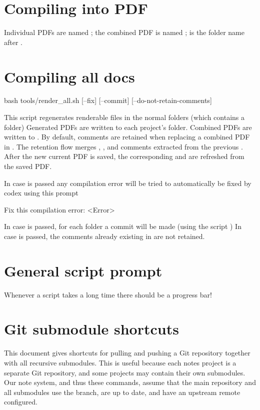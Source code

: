 {\section*{Compiling into PDF}
Individual PDFs are named ; the combined PDF is named ;  is the folder name after .

\section*{Compiling all docs}
\begin{DocCode}
  bash tools/render_all.sh [--fix] [--commit] [--do-not-retain-comments]
\end{DocCode}
This script regenerates renderable files in the normal  folders (which contains a  folder)
Generated PDFs are written to each project's  folder.
Combined PDFs are written to .
By default, comments are retained when replacing a combined PDF in .
The retention flow merges , , and comments extracted from the previous .
After the new current PDF is saved, the corresponding  and  are refreshed from the saved PDF.

In case  is passed any compilation error will be tried to automatically be fixed by codex using this prompt
\begin{DocCode}
  Fix this compilation error:
  <Error>
\end{DocCode}
In case  is passed, for each folder a commit will be made (using the script )
In case  is passed, the comments already existing in  are not retained.


\section*{General script prompt}
Whenever a script takes a long time there should be a progress bar!


\section*{Git submodule shortcuts}
This document gives shortcuts for pulling and pushing a Git repository together with all recursive submodules.
This is useful because each notes project is a separate Git repository, and some projects may contain their own submodules.
Our note system, and thus these commands, assume that the main repository and all submodules use the  branch, are up to date, and have an upstream remote configured.

}
